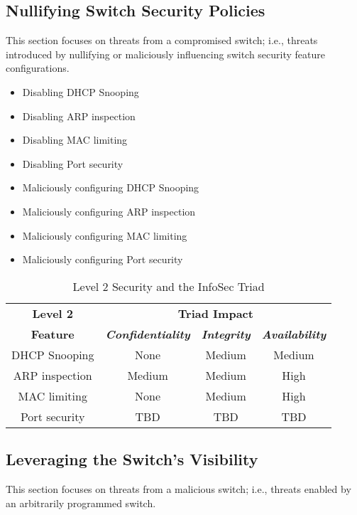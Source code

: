 \documentclass[journal]{IEEEtran}
\newcommand{\textbi}[1]{\textbf{\textit{#1}}}
\begin{document}
\subsection{Nullifying Switch Security Policies}
This section focuses on threats from a compromised switch; i.e., threats introduced by nullifying or
maliciously influencing switch security feature configurations.

\begin{itemize}
  \item Disabling DHCP Snooping
  \item Disabling ARP inspection
  \item Disabling MAC limiting
  \item Disabling Port security
  \item Maliciously configuring DHCP Snooping
  \item Maliciously configuring ARP inspection
  \item Maliciously configuring MAC limiting
  \item Maliciously configuring Port security
\end{itemize}

\begin{table}[htbp]
\caption{Level 2 Security and the InfoSec Triad}
\begin{center}
\begin{tabular}{|c|c|c|c|}
  \hline
  \textbf{Level 2} & \multicolumn{3}{|c|}{\textbf{Triad Impact}} \\ \cline{2-4}
  \textbf{Feature} & \textbi{Confidentiality}& \textbi{Integrity}& \textbi{Availability} \\ \hline

  DHCP Snooping  & None   & Medium & Medium \\ \hline
  ARP inspection & Medium & Medium & High   \\ \hline
  MAC limiting   & None   & Medium & High   \\ \hline
  Port security  & TBD    & TBD    & TBD    \\ \hline
\end{tabular}
\label{tab1}
\end{center}
\end{table}

\subsection{Leveraging the Switch's Visibility}
This section focuses on threats from a malicious switch; i.e., threats enabled by an arbitrarily
programmed switch.
\end{document}

